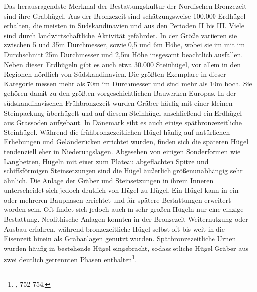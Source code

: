 \documentclass[openany,twoside,twocolumn]{book}
\let\rmarkdownfootnote\footnote%
\def\footnote{\protect\rmarkdownfootnote}
\begin{document}
Das herausragendste Merkmal der Bestattungskultur der Nordischen Bronzezeit sind ihre Grabhügel. Aus der Bronzezeit sind schätzungsweise 100.000 Erdhügel erhalten, die meisten in Südskandinavien und aus den Perioden II bis III. Viele sind durch landwirtschaftliche Aktivität gefährdet. In der Größe variieren sie zwischen 5 und 35m Durchmesser, sowie 0,5 und 6m Höhe, wobei sie im mit im Durchschnitt 25m Durchmesser und 2,5m Höhe insgesamt beachtlich ausfallen. Neben diesen Erdhügeln gibt es auch etwa 30.000 Steinhügel, vor allem in den Regionen nördlich von Südskandinavien. Die größten Exemplare in dieser Kategorie messen mehr als 70m im Durchmesser und sind mehr als 10m hoch. Sie gehören damit zu den größten vorgeschichtlichen Bauwerken Europas. In der südskandinavischen Frühbronzezeit wurden Gräber häufig mit einer kleinen Steinpackung überhügelt und auf diesem Steinhügel anschließend ein Erdhügel aus Grassoden aufgebaut. In Dänemark gibt es auch einige spätbronzezeitliche Steinhügel. Während die frühbronzezeitlichen Hügel häufig auf natürlichen Erhebungen und Geländerücken errichtet wurden, finden sich die späteren Hügel tendenziell eher in Niederungslagen. Abgesehen von einigen Sonderformen wie Langbetten, Hügeln mit einer zum Plateau abgeflachten Spitze und schiffsförmigen Steinsetzungen sind die Hügel äußerlich größenunabhängig sehr ähnlich. Die Anlage der Gräber und Steinsetzungen in ihrem Inneren unterscheidet sich jedoch deutlich von Hügel zu Hügel. Ein Hügel kann in ein oder mehreren Bauphasen errichtet und für spätere Bestattungen erweitert worden sein. Oft findet sich jedoch auch in sehr großen Hügeln nur eine einzige Bestattung. Neolithische Anlagen konnten in der Bronzezeit Weiternutzung oder Ausbau erfahren, während bronzezeitliche Hügel selbst oft bis weit in die Eisenzeit hinein als Grabanlagen genutzt wurden. Spätbronzezeitliche Urnen wurden häufig in bestehende Hügel eingebracht, sodass etliche Hügel Gräber aus zwei deutlich getrennten Phasen enthalten\footnote{\textcite{thrane_scandinavia_2013}, 752-754.}.
\end{document}
